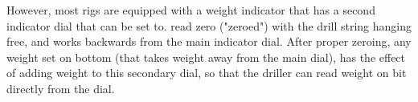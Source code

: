  However, most rigs are equipped with a
weight indicator that has a second indicator dial that can be set to.
read zero ("zeroed") with the drill string hanging free, and works
backwards from the main indicator dial. After proper zeroing, any
weight set on bottom (that takes weight away from the main dial), has
the effect of adding weight to this secondary dial, so that the driller
can read weight on bit directly from the dial.